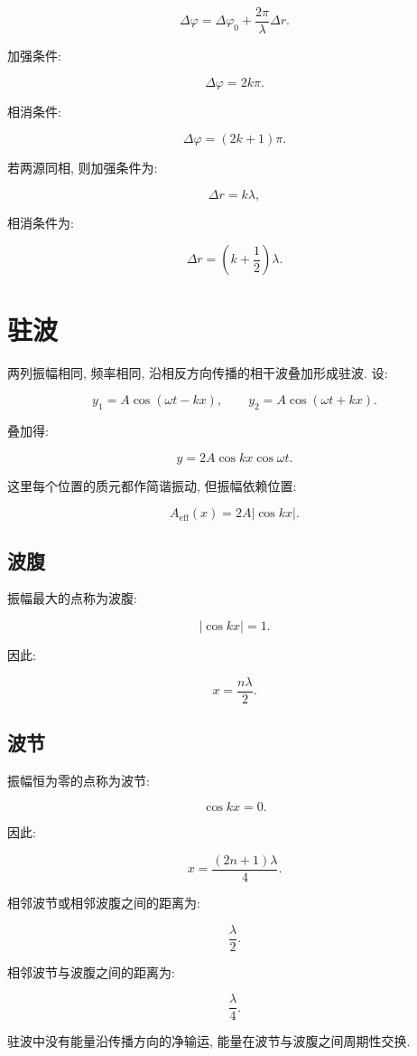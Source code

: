 \documentclass[
  a4paper,
]{ctexrep}
\begin{document}
\[
\Delta\varphi=\Delta\varphi_0+\frac{2\pi}{\lambda}\Delta r.
\]

加强条件:

\[
\Delta\varphi=2k\pi.
\]

相消条件:

\[
\Delta\varphi=(2k+1)\pi.
\]

若两源同相, 则加强条件为:

\[
\Delta r=k\lambda,
\]

相消条件为:

\[
\Delta r=\left(k+\frac{1}{2}\right)\lambda.
\]

\section{驻波}\label{ux9a7bux6ce2}

两列振幅相同, 频率相同, 沿相反方向传播的相干波叠加形成驻波. 设:

\[
y_1=A\cos(\omega t-kx),
\qquad
y_2=A\cos(\omega t+kx).
\]

叠加得:

\[
y=2A\cos kx\cos\omega t.
\]

这里每个位置的质元都作简谐振动, 但振幅依赖位置:

\[
A_{\mathrm{eff}}(x)=2A|\cos kx|.
\]

\subsection{波腹}\label{ux6ce2ux8179}

振幅最大的点称为波腹:

\[
|\cos kx|=1.
\]

因此:

\[
x=\frac{n\lambda}{2}.
\]

\subsection{波节}\label{ux6ce2ux8282}

振幅恒为零的点称为波节:

\[
\cos kx=0.
\]

因此:

\[
x=\frac{(2n+1)\lambda}{4}.
\]

相邻波节或相邻波腹之间的距离为:

\[
\frac{\lambda}{2}.
\]

相邻波节与波腹之间的距离为:

\[
\frac{\lambda}{4}.
\]

驻波中没有能量沿传播方向的净输运, 能量在波节与波腹之间周期性交换.
\end{document}
